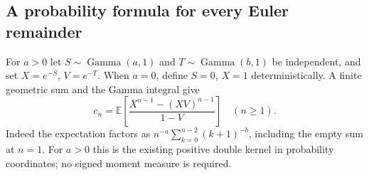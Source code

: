 \documentclass[11pt,letterpaper]{article}
\theoremstyle{definition}
\theoremstyle{remark}
\begin{document}
\subsection{A probability formula for every Euler remainder}

For $a>0$ let $S\sim\operatorname{Gamma}(a,1)$ and
$T\sim\operatorname{Gamma}(b,1)$ be independent, and set
$X=e^{-S}$, $V=e^{-T}$. When $a=0$, define $S=0$, $X=1$
deterministically. A finite geometric sum and the Gamma integral give
\begin{equation}\label{newEuler:eq:moments}
 c_n=\mathbb E\!\left[
       \frac{X^{n-1}-(XV)^{n-1}}{1-V}\right]\quad(n\ge1).
\end{equation}
Indeed the expectation factors as
$n^{-a}\sum_{k=0}^{n-2}(k+1)^{-b}$, including the empty sum at
$n=1$. For $a>0$ this is the existing positive double kernel in
probability coordinates; no signed moment measure is required.
\end{document}
